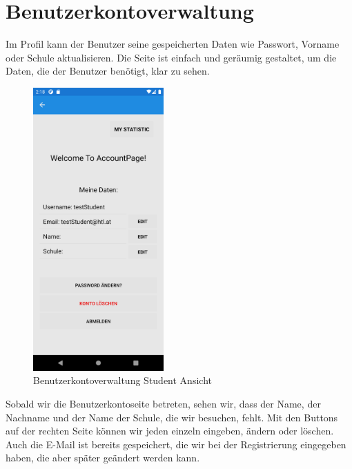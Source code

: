 \section{Benutzerkontoverwaltung}
Im Profil kann der Benutzer seine gespeicherten Daten wie Passwort, Vorname oder
Schule aktualisieren.
Die Seite ist einfach und geräumig gestaltet, um die Daten, die der Benutzer benötigt, klar zu sehen.
\vspace{2cm}
\begin{figure}[h]
    \begin{center}
        \includegraphics*[width=5cm]{pics/Xamarin Student/13 My Acc.png}
        \caption[MyAccount]{Benutzerkontoverwaltung Student Ansicht}
    \end{center}
\end{figure}
\newpage
Sobald wir die Benutzerkontoseite betreten, sehen wir, dass der Name, der Nachname und der Name der Schule, die wir besuchen, fehlt. Mit den Buttons auf der rechten Seite können wir jeden einzeln eingeben, ändern oder löschen. Auch die E-Mail ist bereits gespeichert, die wir bei der Registrierung eingegeben haben, die aber später geändert werden kann.
\newline
